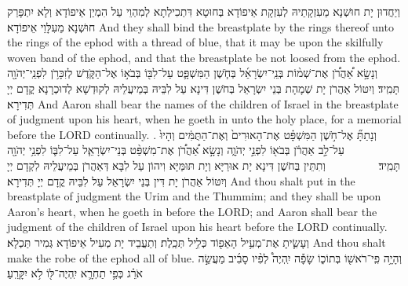 {{וְיַחֲדוּן יָת חוּשְׁנָא מֵעִזְקָתֵיהּ לְעִזְקָת אֵיפוֹדָא בְּחוּטָא דִּתְכִילְתָא לְמִהְוֵי עַל הִמְיַן אֵיפוֹדָא וְלָא יִתְפָּרַק חוּשְׁנָא מֵעִלָּוֵי אֵיפוֹדָא׃}
{And they shall bind the breastplate by the rings thereof unto the rings of the ephod with a thread of blue, that it may be upon the skilfully woven band of the ephod, and that the breastplate be not loosed from the ephod.}{}
{וְנָשָׂ֣א אַ֠הֲרֹ֠ן אֶת־שְׁמ֨וֹת בְּנֵֽי־יִשְׂרָאֵ֜ל בְּחֹ֧שֶׁן הַמִּשְׁפָּ֛ט עַל־לִבּ֖וֹ בְּבֹא֣וֹ אֶל־הַקֹּ֑דֶשׁ לְזִכָּרֹ֥ן לִפְנֵֽי־יְהֹוָ֖ה תָּמִֽיד׃}
{וְיִטּוֹל אַהֲרֹן יָת שְׁמָהָת בְּנֵי יִשְׂרָאֵל בְּחֹשֶׁן דִּינָא עַל לִבֵּיהּ בְּמֵיעֲלֵיהּ לְקוּדְשָׁא לְדוּכְרָנָא קֳדָם יְיָ תְּדִירָא׃}
{And Aaron shall bear the names of the children of Israel in the breastplate of judgment upon his heart, when he goeth in unto the holy place, for a memorial before the LORD continually. .}{}
{וְנָתַתָּ֞ אֶל־חֹ֣שֶׁן הַמִּשְׁפָּ֗ט אֶת־הָאוּרִים֙ וְאֶת־הַתֻּמִּ֔ים וְהָיוּ֙ עַל־לֵ֣ב אַהֲרֹ֔ן בְּבֹא֖וֹ לִפְנֵ֣י יְהֹוָ֑ה וְנָשָׂ֣א אַ֠הֲרֹ֠ן אֶת־מִשְׁפַּ֨ט בְּנֵי־יִשְׂרָאֵ֧ל עַל־לִבּ֛וֹ לִפְנֵ֥י יְהֹוָ֖ה תָּמִֽיד׃ \setuma         
}
{וְתִתֵּין בְּחֹשֶׁן דִּינָא יָת אוּרַיָּא וְיָת תּוּמַּיָּא וִיהוֹן עַל לִבָּא דְּאַהֲרֹן בְּמֵיעֲלֵיהּ לִקְדָם יְיָ וְיִטּוֹל אַהֲרֹן יָת דִּין בְּנֵי יִשְׂרָאֵל עַל לִבֵּיהּ קֳדָם יְיָ תְּדִירָא׃}
{And thou shalt put in the breastplate of judgment the Urim and the Thummim; and they shall be upon Aaron’s heart, when he goeth in before the LORD; and Aaron shall bear the judgment of the children of Israel upon his heart before the LORD continually.}{}
{וְעָשִׂ֛יתָ אֶת־מְעִ֥יל הָאֵפ֖וֹד כְּלִ֥יל תְּכֵֽלֶת׃
}
{וְתַעֲבֵיד יָת מְעִיל אֵיפוֹדָא גְּמִיר תַּכְלָא׃}
{And thou shalt make the robe of the ephod all of blue.}{}
{וְהָיָ֥ה פִֽי־רֹאשׁ֖וֹ בְּתוֹכ֑וֹ שָׂפָ֡ה יִֽהְיֶה֩ לְפִ֨יו סָבִ֜יב מַעֲשֵׂ֣ה אֹרֵ֗ג כְּפִ֥י תַחְרָ֛א יִֽהְיֶה־לּ֖וֹ לֹ֥א יִקָּרֵֽעַ׃
}}
